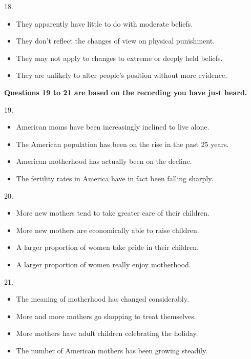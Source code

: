 \documentclass[UTF8,11pt]{ctexart}
\begin{document}
18.


\begin{itemize}[leftmargin=2em,itemsep=.2em,topsep=.4em]\item[A.] They apparently have little to do with moderate beliefs.
\item[B.] They don’t reflect the changes of view on physical punishment.
\item[C.] They may not apply to changes to extreme or deeply held beliefs.
\item[D.] They are unlikely to alter people’s position without more evidence.
\end{itemize}

\textbf{Questions 19 to 21 are based on the recording you have just heard.}


19.


\begin{itemize}[leftmargin=2em,itemsep=.2em,topsep=.4em]\item[A.] American moms have been increasingly inclined to live alone.
\item[B.] The American population has been on the rise in the past 25 years.
\item[C.] American motherhood has actually been on the decline.
\item[D.] The fertility rates in America have in fact been falling sharply.
\end{itemize}

20.


\begin{itemize}[leftmargin=2em,itemsep=.2em,topsep=.4em]\item[A.] More new mothers tend to take greater care of their children.
\item[B.] More new mothers are economically able to raise children.
\item[C.] A larger proportion of women take pride in their children.
\item[D.] A larger proportion of women really enjoy motherhood.
\end{itemize}

21.


\begin{itemize}[leftmargin=2em,itemsep=.2em,topsep=.4em]\item[A.] The meaning of motherhood has changed considerably.
\item[B.] More and more mothers go shopping to treat themselves.
\item[C.] More mothers have adult children celebrating the holiday.
\item[D.] The number of American mothers has been growing steadily.
\end{itemize}
\end{document}
